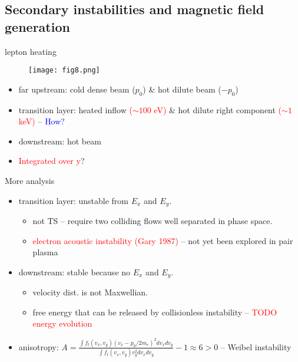\documentclass[10pt]{beamer}
\begin{document}
\subsection{Secondary instabilities and magnetic field generation}



\begin{frame}{lepton heating}
\begin{figure}
\texttt{[image: fig8.png]}
\end{figure}

\begin{itemize}
\item far upstream: cold dense beam ($p_0$) \& hot dilute beam ($-p_0$)
\item transition layer: heated inflow \textcolor{red}{($\sim 100$ eV)} \& hot dilute right component \textcolor{red}{($\sim 1$ keV)} -- \textcolor{blue}{How?}
\item downstream: hot beam
\item \textcolor{red}{Integrated over y}?
\end{itemize}
\end{frame}

\begin{frame}{More analysis}
\begin{itemize}
\item transition layer: unstable from $E_x$ and $E_y$.
\begin{itemize}
\item not TS -- require two colliding flows well separated in phase space.
\item \textcolor{red}{electron acoustic instability (Gary 1987)} -- not yet been explored in pair plasma
\end{itemize}
\item downstream: stable because no $E_x$ and $E_y$.
\begin{itemize}
\item velocity dist. is not Maxwellian.
\item free energy that can be released by collisionless instability -- \textcolor{red}{TODO energy evolution}
\end{itemize}
\item anisotropy: $A = \frac{\int f_t(v_x,v_y)(v_x-p_0/2m_e)^2dv_xdv_y}{\int f_t(v_x,v_y)v_y^2dv_xdv_y} -1 \approx 6 > 0$ -- Weibel instability
\end{itemize}
\end{frame}
\end{document}
